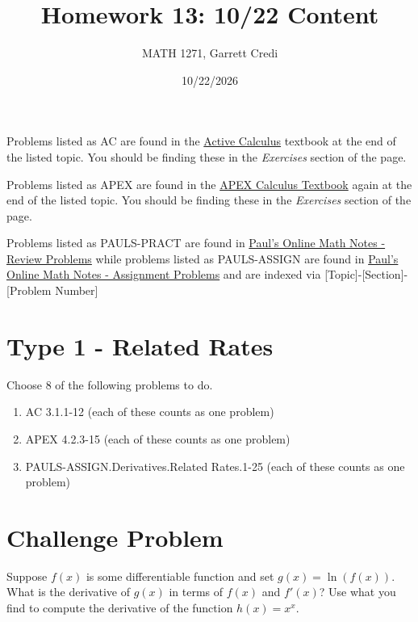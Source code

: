 \documentclass[12pt]{article}
\title{Homework 13: 10/22 Content}
\author{MATH 1271, Garrett Credi}
\date{10/22/2026}
\begin{document}
\maketitle

Problems listed as AC are found in the \href{https://activecalculus.org/single1e/frontmatter.html}{Active Calculus} 
textbook at the end of the listed topic. You should be finding these in the \textit{Exercises} section of the page.

Problems listed as APEX are found in the \href{https://opentext.uleth.ca/apex-calculus/apex-calculus.html}{APEX Calculus Textbook}
again at the end of the listed topic. You should be finding these in the \textit{Exercises} section of the page.

Problems listed as PAULS-PRACT are found in \href{https://tutorial.math.lamar.edu/Problems/CalcI/CalcI.aspx}{Paul's Online Math Notes - Review Problems}
while problems listed as PAULS-ASSIGN are found in \href{https://tutorial.math.lamar.edu/ProblemsNS/CalcI/CalcI.aspx}{Paul's Online Math Notes - Assignment Problems}
and are indexed via [Topic]-[Section]-[Problem Number]

\section{Type 1 - Related Rates}
Choose 8 of the following problems to do.

\begin{enumerate}
  \item AC 3.1.1-12 (each of these counts as one problem)
  \item APEX 4.2.3-15 (each of these counts as one problem)
  \item PAULS-ASSIGN.Derivatives.Related Rates.1-25 (each of these counts as one problem)
\end{enumerate}

\section{Challenge Problem}

Suppose $f(x)$ is some differentiable function and set $g(x) = \ln(f(x))$.
What is the derivative of $g(x)$ in terms of $f(x)$ and $f'(x)$?
Use what you find to compute the derivative of the function $h(x) = x^x$.


\end{document}
